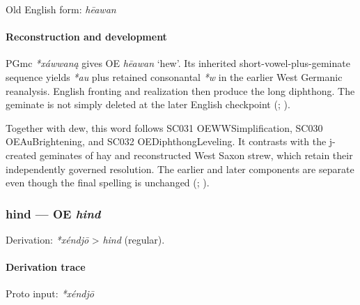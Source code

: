 \documentclass[
  british,
  a4paper,
]{article}
\begin{document}
Old English form: \emph{hēawan}

\paragraph{Reconstruction and
development}\label{reconstruction-and-development-2}

PGmc \emph{*xáwwaną} gives OE \emph{hēawan} `hew'. Its inherited
short-vowel-plus-geminate sequence yields \emph{*au} plus retained
consonantal \emph{*w} in the earlier West Germanic reanalysis. English
fronting and realization then produce the long diphthong. The geminate
is not simply deleted at the later English checkpoint
(;
).

Together with dew, this word follows SC031 OEWWSimplification, SC030
OEAuBrightening, and SC032 OEDiphthongLeveling. It contrasts with the
j-created geminates of hay and reconstructed West Saxon strew, which
retain their independently governed resolution. The earlier and later
components are separate even though the final spelling is unchanged
(;
).

\subsubsection{\texorpdfstring{hind --- OE
\emph{hind}}{hind --- OE hind}}\label{hind-oe-hind}

Derivation: \emph{*xéndjō} \textgreater{} \emph{hind} (regular).

\paragraph{Derivation trace}\label{derivation-trace-45}

Proto input: \emph{*xéndjō}

\begingroup
\setlength{\fboxsep}{6pt}
\end{document}
